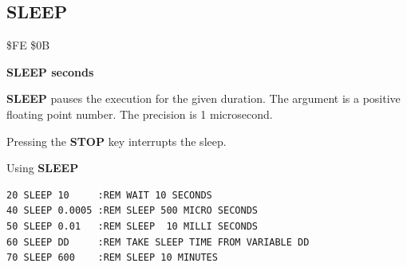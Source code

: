 
\newpage
\subsection{SLEEP}
\begin{description}[leftmargin=2cm,style=nextline]
\item [Token:] \$FE \$0B
\item [Format:] {\bf SLEEP seconds}
\item [Usage:] {\bf SLEEP} pauses the execution
               for the given duration. The argument is a
               positive floating point number.
               The precision is 1 microsecond.
\item [Remarks:] Pressing the {\bf STOP} key interrupts the sleep.

\item [Example:] Using {\bf SLEEP}
\begin{tcolorbox}[colback=black,coltext=white]
\verbatimfont{\codefont}
\begin{verbatim}
20 SLEEP 10     :REM WAIT 10 SECONDS
40 SLEEP 0.0005 :REM SLEEP 500 MICRO SECONDS
50 SLEEP 0.01   :REM SLEEP  10 MILLI SECONDS
60 SLEEP DD     :REM TAKE SLEEP TIME FROM VARIABLE DD
70 SLEEP 600    :REM SLEEP 10 MINUTES
\end{verbatim}
\end{tcolorbox}
\end{description}


\newpage
